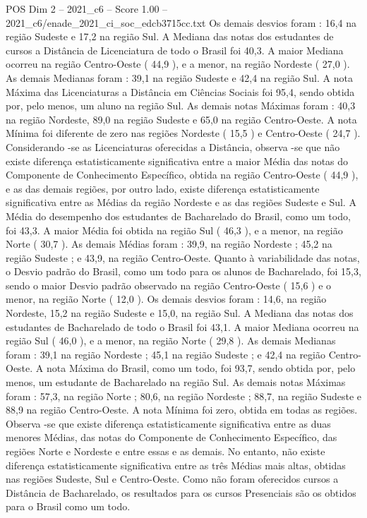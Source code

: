 \begin{textsample}{POS Dim 2 – 2021\_c6 – Score 1.00 – 2021\_c6/enade\_2021\_ci\_soc\_edcb3715cc.txt}
Os demais desvios foram : 16,4 na região Sudeste e 17,2 na região Sul.
A Mediana das notas dos estudantes de cursos a Distância de Licenciatura de todo o Brasil foi 40,3.
A maior Mediana ocorreu na região Centro-Oeste ( 44,9 ), e a menor, na região Nordeste ( 27,0 ).
As demais Medianas foram : 39,1 na região Sudeste e 42,4 na região Sul.
A nota Máxima das Licenciaturas a Distância em Ciências Sociais foi 95,4, sendo obtida por, pelo menos, um aluno na região Sul.
As demais notas Máximas foram : 40,3 na região Nordeste, 89,0 na região Sudeste e 65,0 na região Centro-Oeste.
A nota Mínima foi diferente de zero nas regiões Nordeste ( 15,5 ) e Centro-Oeste ( 24,7 ).
Considerando -se as Licenciaturas oferecidas a Distância, observa -se que não existe diferença estatisticamente significativa entre a maior Média das notas do Componente de Conhecimento Específico, obtida na região Centro-Oeste ( 44,9 ), e as das demais regiões, por outro lado, existe diferença estatisticamente significativa entre as Médias da região Nordeste e as das regiões Sudeste e Sul.
A Média do desempenho dos estudantes de Bacharelado do Brasil, como um todo, foi 43,3.
A maior Média foi obtida na região Sul ( 46,3 ), e a menor, na região Norte ( 30,7 ).
As demais Médias foram : 39,9, na região Nordeste ; 45,2 na região Sudeste ; e 43,9, na região Centro-Oeste.
Quanto à variabilidade das notas, o Desvio padrão do Brasil, como um todo para os alunos de Bacharelado, foi 15,3, sendo o maior Desvio padrão observado na região Centro-Oeste ( 15,6 ) e o menor, na região Norte ( 12,0 ).
Os demais desvios foram : 14,6, na região Nordeste, 15,2 na região Sudeste e 15,0, na região Sul.
A Mediana das notas dos estudantes de Bacharelado de todo o Brasil foi 43,1.
A maior Mediana ocorreu na região Sul ( 46,0 ), e a menor, na região Norte ( 29,8 ).
As demais Medianas foram : 39,1 na região Nordeste ; 45,1 na região Sudeste ; e 42,4 na região Centro-Oeste.
A nota Máxima do Brasil, como um todo, foi 93,7, sendo obtida por, pelo menos, um estudante de Bacharelado na região Sul.
As demais notas Máximas foram : 57,3, na região Norte ; 80,6, na região Nordeste ; 88,7, na região Sudeste e 88,9 na região Centro-Oeste.
A nota Mínima foi zero, obtida em todas as regiões.
Observa -se que existe diferença estatisticamente significativa entre as duas menores Médias, das notas do Componente de Conhecimento Específico, das regiões Norte e Nordeste e entre essas e as demais.
No entanto, não existe diferença estatisticamente significativa entre as três Médias mais altas, obtidas nas regiões Sudeste, Sul e Centro-Oeste.
Como não foram oferecidos cursos a Distância de Bacharelado, os resultados para os cursos Presenciais são os obtidos para o Brasil como um todo.

\end{textsample}
